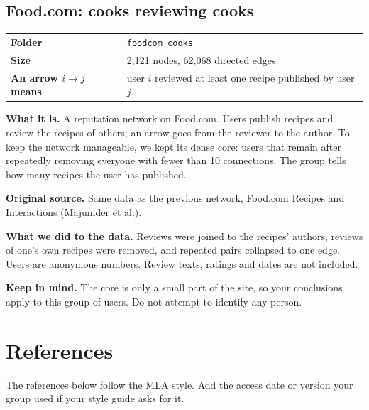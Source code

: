 \documentclass[11pt,a4paper]{article}
\makeatletter
\newcommand{\code}[1]{\texttt{#1}}
\newcommand{\dataset}[9]{%
  \subsection{#1}
  \begin{tabularx}{\textwidth}{@{}>{\bfseries}l X@{}}
    Folder & \code{#2}\\
    Size & #3 nodes, #4 directed edges\\
    An arrow $i\to j$ means & #5\\
  \end{tabularx}

  \textbf{What it is.} #6

  \textbf{Original source.} #7

  \textbf{What we did to the data.} #8

  \textbf{Keep in mind.} #9
}
\makeatother
\begin{document}
\dataset{Food.com: cooks reviewing cooks}{foodcom\_cooks}{2,121}{62,068}
{user $i$ reviewed at least one recipe published by user $j$.}
{A reputation network on Food.com. Users publish recipes and review the recipes of others; an arrow goes from the reviewer to the author. To keep the network manageable, we kept its dense core: users that remain after repeatedly removing everyone with fewer than 10 connections. The group tells how many recipes the user has published.}
{Same data as the previous network, Food.com Recipes and Interactions (Majumder et al.).}
{Reviews were joined to the recipes' authors, reviews of one's own recipes were removed, and repeated pairs collapsed to one edge. Users are anonymous numbers. Review texts, ratings and dates are not included.}
{The core is only a small part of the site, so your conclusions apply to this group of users. Do not attempt to identify any person.}

\section{References}

The references below follow the MLA style. Add the access date or version your group used if your style guide asks for it.
\end{document}
